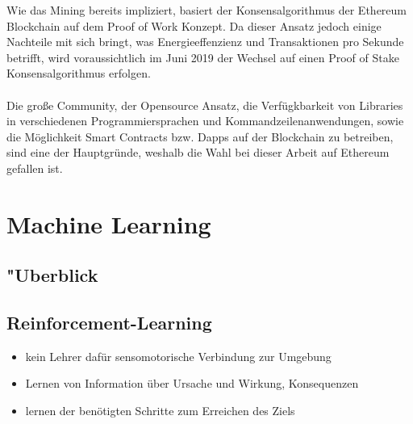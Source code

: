Wie das Mining bereits impliziert, basiert der Konsensalgorithmus der Ethereum Blockchain auf dem Proof of Work Konzept. Da dieser Ansatz jedoch einige Nachteile mit sich bringt, was Energieeffenzienz und Transaktionen pro Sekunde betrifft, wird voraussichtlich im Juni 2019 der Wechsel auf einen Proof of Stake Konsensalgorithmus erfolgen. \\\\
Die große Community, der Opensource Ansatz, die Verfügkbarkeit von Libraries in verschiedenen Programmiersprachen und Kommandzeilenanwendungen, sowie die Möglichkeit Smart Contracts bzw. Dapps auf der Blockchain zu betreiben, sind eine der Hauptgründe, weshalb die Wahl bei dieser Arbeit auf Ethereum gefallen ist.   



\section{Machine Learning}
\subsection{"Uberblick}
\subsection{Reinforcement-Learning}
\begin{itemize}
    \item kein Lehrer dafür sensomotorische Verbindung zur Umgebung
    \item Lernen von Information über Ursache und Wirkung, Konsequenzen
    \item lernen der benötigten Schritte zum Erreichen des Ziels
\end{itemize}

